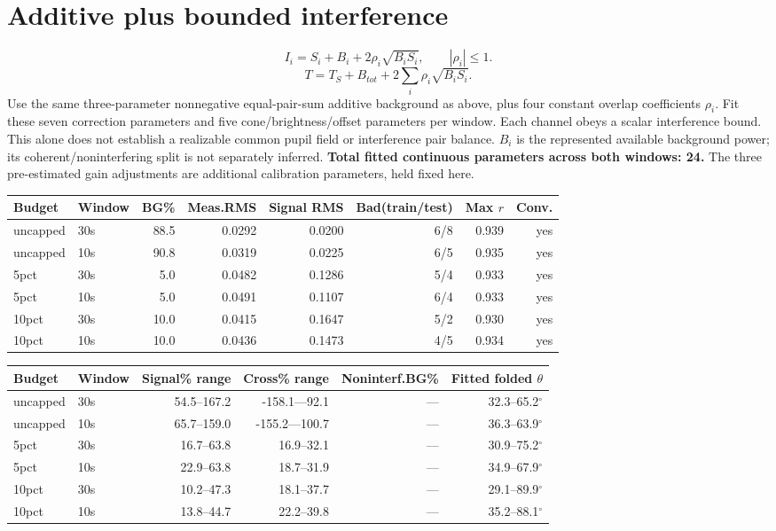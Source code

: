 \documentclass[10pt,a4paper]{article}
\begin{document}
\section{Additive plus bounded interference}
\[I_i=S_i+B_i+2\rho_i\sqrt{B_iS_i},\qquad |\rho_i|\leq1.\]
\[T=T_S+B_{tot}+2\sum_i\rho_i\sqrt{B_iS_i}.\]
Use the same three-parameter nonnegative equal-pair-sum additive background as above, plus four constant overlap coefficients $\rho_i$. Fit these seven correction parameters and five cone/brightness/offset parameters per window. Each channel obeys a scalar interference bound. This alone does not establish a realizable common pupil field or interference pair balance. $B_i$ is the represented available background power; its coherent/noninterfering split is not separately inferred.
\textbf{Total fitted continuous parameters across both windows: 24.} The three pre-estimated gain adjustments are additional calibration parameters, held fixed here.
\begin{longtable}{llrrrrrr}\toprule
Budget & Window & BG\% & Meas.RMS & Signal RMS & Bad(train/test) & Max $r$ & Conv.\\\midrule\endhead
uncapped & 30s & 88.5 & 0.0292 & 0.0200 & 6/8 & 0.939 & yes \\
uncapped & 10s & 90.8 & 0.0319 & 0.0225 & 6/5 & 0.935 & yes \\
5pct & 30s & 5.0 & 0.0482 & 0.1286 & 5/4 & 0.933 & yes \\
5pct & 10s & 5.0 & 0.0491 & 0.1107 & 6/4 & 0.933 & yes \\
10pct & 30s & 10.0 & 0.0415 & 0.1647 & 5/2 & 0.930 & yes \\
10pct & 10s & 10.0 & 0.0436 & 0.1473 & 4/5 & 0.934 & yes \\
\bottomrule\end{longtable}
\begin{longtable}{llrrrr}\toprule
Budget & Window & Signal\% range & Cross\% range & Noninterf.BG\% & Fitted folded $\theta$\\\midrule\endhead
uncapped & 30s & 54.5--167.2 & -158.1---92.1 & --- & 32.3--65.2$^\circ$ \\
uncapped & 10s & 65.7--159.0 & -155.2---100.7 & --- & 36.3--63.9$^\circ$ \\
5pct & 30s & 16.7--63.8 & 16.9--32.1 & --- & 30.9--75.2$^\circ$ \\
5pct & 10s & 22.9--63.8 & 18.7--31.9 & --- & 34.9--67.9$^\circ$ \\
10pct & 30s & 10.2--47.3 & 18.1--37.7 & --- & 29.1--89.9$^\circ$ \\
10pct & 10s & 13.8--44.7 & 22.2--39.8 & --- & 35.2--88.1$^\circ$ \\
\bottomrule\end{longtable}
\end{document}
